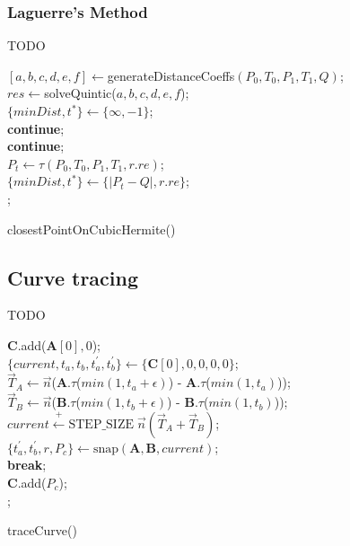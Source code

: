 \documentclass[journal, letterpaper]{IEEEtran}
\begin{document}
\subsubsection{Laguerre's Method}
TODO
\blindtext
{}
\begin{algorithm}[ht!]
  $[a,b,c,d,e,f] \leftarrow $generateDistanceCoeffs$(P_0,T_0,P_1,T_1,Q)$; \\
  $res \leftarrow $solveQuintic($a,b,c,d,e,f$); \\
  $\{minDist, t^*\} \leftarrow \{\infty,-1\}$;\\
   {
     \textbf{continue}; \\
     \textbf{continue}; \\
    $P_t \leftarrow \tau(P_0,T_0,P_1,T_1,r.re)$; \\
     {
      $\{minDist, t^*\} \leftarrow \{|P_t - Q|, r.re\}$;\\
    }
  }
  ;
  \caption{closestPointOnCubicHermite()}
\end{algorithm}

\subsection{Curve tracing}
TODO
\blindtext

\begin{algorithm}[ht!]
  $\mathbf{C}.$add($\mathbf{A}[0], 0$); \\
  $\{current, t_a, t_b, t_a^\prime, t_b^\prime\} \leftarrow \{\mathbf{C}[0],0,0,0,0\}$; \\
   {
  $\vec{T}_A \leftarrow \vec{n}$($\mathbf{A}.\tau$($min(1,t_a+\epsilon)$) - $\mathbf{A}.\tau$($min(1,t_a)$)); \\
  $\vec{T}_B \leftarrow \vec{n}$($\mathbf{B}.\tau$($min(1,t_b+\epsilon)$) - $\mathbf{B}.\tau$($min(1,t_b)$)); \\
  $current \stackrel{+}\leftarrow \text{STEP\_SIZE} \;\vec{n}(\vec{T}_A + \vec{T}_B)$; \\
  $\{t_a^\prime, t_b^\prime, r, P_c\} \leftarrow \text{snap}(\mathbf{A},\mathbf{B},current)$; \\
   \textbf{break}; \\
  $\mathbf{C}.$add($P_c$); \\
  }
  ;
  \caption{traceCurve()}
\end{algorithm}
\end{document}
